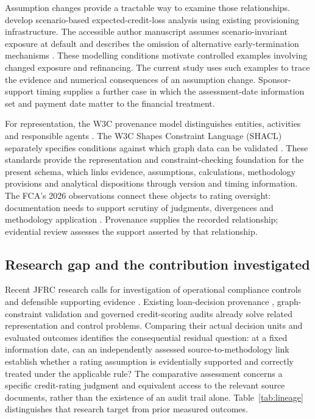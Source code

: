 \documentclass[11pt,a4paper]{article}
\begin{document}
Assumption changes provide a tractable way to examine those relationships. \citet{alaghmandan2026b} develop scenario-based expected-credit-loss analysis using existing provisioning infrastructure. The accessible author manuscript assumes scenario-invariant exposure at default and describes the omission of alternative early-termination mechanisms \citep{alaghmandan2026a}. These modelling conditions motivate controlled examples involving changed exposure and refinancing. The current study uses such examples to trace the evidence and numerical consequences of an assumption change. Sponsor-support timing supplies a further case in which the assessment-date information set and payment date matter to the financial treatment.

For representation, the W3C provenance model distinguishes entities, activities and responsible agents \citep{moreau2013}. The W3C Shapes Constraint Language (SHACL) separately specifies conditions against which graph data can be validated \citep{shacl2017}. These standards provide the representation and constraint-checking foundation for the present schema, which links evidence, assumptions, calculations, methodology provisions and analytical dispositions through version and timing information. The FCA's 2026 observations connect these objects to rating oversight: documentation needs to support scrutiny of judgments, divergences and methodology application \citep{fca2026}. Provenance supplies the recorded relationship; evidential review assesses the support asserted by that relationship.

\subsection{Research gap and the contribution investigated}

Recent JFRC research calls for investigation of operational compliance controls and defensible supporting evidence \citep{castro2026,aria2026,sitab2026}. Existing loan-decision provenance \citep{huynh2021}, graph-constraint validation \citep{shacl2017} and governed credit-scoring audits \citep{benamor2026,khalili2026} already solve related representation and control problems. Comparing their actual decision units and evaluated outcomes identifies the consequential residual question: at a fixed information date, can an independently assessed source-to-methodology link establish whether a rating assumption is evidentially supported and correctly treated under the applicable rule? The comparative assessment concerns a specific credit-rating judgment and equivalent access to the relevant source documents, rather than the existence of an audit trail alone. Table~\ref{tab:lineage} distinguishes that research target from prior measured outcomes.
\end{document}
